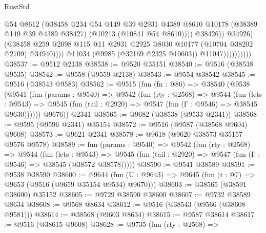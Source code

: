 \begin{lexlean}{RustStd}
\begin{coremodule}
                                      @54
                                      @8612
                                      (@38458
                                        @234
                                        @54
                                        @149
                                        @39
                                        @2931
                                        @4389
                                        @8610
                                        @10178
                                        (@38389 @149 @39 @4389 @38427)
                                        (@10213 (@10841 @54 @8610))))
                                    @38426))
                                @34926)
                              (@38458
                                @259
                                @2098
                                @115
                                @11
                                @2931
                                @2925
                                @8030
                                @10177
                                (@10704 @38202 @2709)
                                @34940))))
                        @11034
                        (@9985 (@32169 @2325 @10603))
                        @11047))))))))))
@38537 := @9512 @2138
@38538 := @9520 @35151
@38540 := @9516 (@38538 @9535)
@38542 := @9558 (@9559 @2138)
@38543 := @9554 @38542
@38545 := @9516 (@38543 @9583)
@38562 := @9515
    (fun (fn : @86) =>
    @38540
      (@9538
        (@9541
          (fun (params : @9540) =>
          @9542
            (fun (rty : @2568) =>
            @9544
              (fun (lets : @9543) =>
              @9545 (fun (tail : @2920) => @9547 (fun (Γ : @9546) => @38545 @9630))))))
        @9676))
    @2341
@38565 := @9682 (@38538 (@9533 @2341))
@38568 := @9595 (@9596 @2341) @35154
@38572 := @9516 (@9587 (@38568 @9604) @9608)
@38573 := @9621 @2341
@38578 := @9618 (@9620 @38573 @35157 @9576 @9578)
@38589 := fun (params : @9540) =>
  @9542
    (fun (rty : @2568) =>
    @9544
      (fun (lets : @9543) =>
      @9545 (fun (tail : @2920) => @9547 (fun (Γ : @9546) => @38545 (@38572 @38578)))))
@38590 := @9541 @38589
@38591 := @9538 @38590
@38600 := @9644
    (fun (U : @9643) => @9645 (fun (t : @7) => @9653 (@9516 (@9659 @35154 @9534) @9670)))
@38603 := @38565 (@38591 @38600) @35152
@38605 := @9729 @38590 @38600
@38607 := @9732 @38589 @8634
@38608 := @9568 @8634
@38612 := @9516 (@38543 (@9566 (@38608 @9581)))
@38614 := @38568 (@9603 @8634)
@38615 := @9587 @38614
@38617 := @9516 (@38615 @9608)
@38628 := @9735
    (fun (rty : @2568) =>

\end{coremodule}
\end{lexlean}
